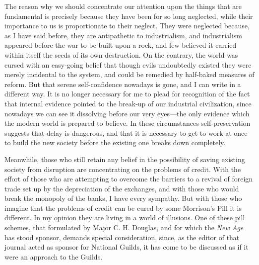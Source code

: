 \documentclass{book}
\begin{document}
The reason why we should concentrate our attention upon the things that are fundamental is precisely because they have been for so long neglected, while their importance to us is proportionate to their neglect. They were neglected because, as I have said before, they are antipathetic to industrialism, and industrialism appeared before the war to be built upon a rock, and few believed it carried within itself the seeds of its own destruction. On the contrary, the world was cursed with an easy-going belief that though evils undoubtedly existed they were merely incidental to the system, and could be remedied by half-baked measures of reform. But that serene self-confidence nowadays is gone, and I can write in a different way. It is no longer necessary for me to plead for recognition of the fact that internal evidence pointed to the break-up of our industrial civilization, since nowadays we can see it dissolving before our very eyes—the only evidence which the modern world is prepared to believe. In these circumstances self-preservation suggests that delay is dangerous, and that it is necessary to get to work at once to build the new society before the existing one breaks down completely.

Meanwhile, those who still retain any belief in the possibility of saving existing society from disruption are concentrating on the problems of credit. With the effort of those who are attempting to overcome the barriers to a revival of foreign trade set up by the depreciation of the exchanges, and with those who would break the monopoly of the banks, I have every sympathy. But with those who imagine that the problems of credit can be cured by some Morrison’s Pill it is different. In my opinion they are living in a world of illusions. One of these pill schemes, that formulated by Major C. H. Douglas, and for which the \emph{New Age} has stood sponsor, demands special consideration, since, as the editor of that journal acted as sponsor for National Guilds, it has come to be discussed as if it were an approach to the Guilds.
\end{document}
